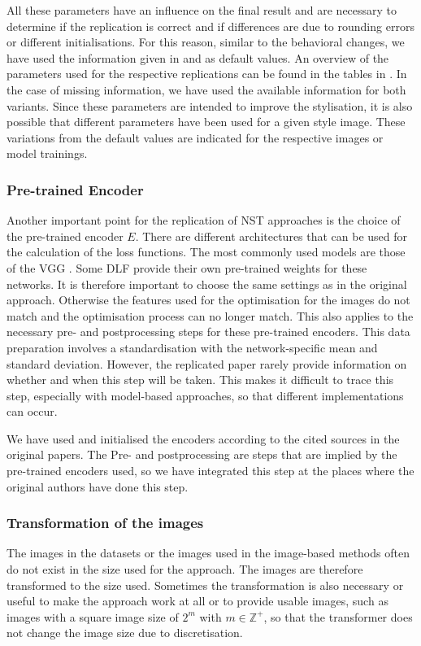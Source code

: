 All these parameters have an influence on the final result and are necessary to determine if the replication is correct and if differences are due to rounding errors or different initialisations. For this reason, similar to the behavioral changes, we have used the information given in \paper{} and \implementation{} as default values. An overview of the parameters used for the respective replications can be found in the tables in . In the case of missing information, we have used the available information for both variants. Since these parameters are intended to improve the stylisation, it is also possible that different parameters have been used for a given style image. These variations from the default values are indicated for the respective images or model trainings.

\subsubsection{Pre-trained Encoder}
Another important point for the replication of \gls{NST} approaches is the choice of the pre-trained encoder $E$. There are different architectures that can be used for the calculation of the loss functions. The most commonly used models are those of the \gls{VGG} \cite{SZ2015}. Some \gls{DLF} provide their own pre-trained weights for these networks. It is therefore important to choose the same settings as in the original approach. Otherwise the features used for the optimisation for the images do not match and the optimisation process can no longer match. This also applies to the necessary pre- and postprocessing steps for these pre-trained encoders. This data preparation involves a standardisation with the network-specific mean and standard deviation. However, the replicated paper rarely provide information on whether and when this step will be taken. This makes it difficult to trace this step, especially with model-based approaches, so that different implementations can occur.  

We have used and initialised the encoders according to the cited sources in the original papers. The Pre- and postprocessing are steps that are implied by the pre-trained encoders used, so we have integrated this step at the places where the original authors have done this step.

\subsubsection{Transformation of the images}
The images in the datasets or the images used in the image-based methods often do not exist in the size used for the approach. The images are therefore transformed to the size used. Sometimes the transformation is also necessary or useful to make the approach work at all or to provide usable images, such as images with a square image size of $2^{m}$ with $ m \in \mathbb{Z}^{+}$, so that the transformer does not change the image size due to discretisation. 

